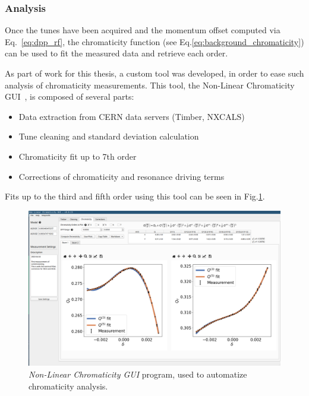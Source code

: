 \subsubsection{Analysis}

Once the tunes have been acquired and the momentum offset computed via Eq.~\eqref{eq:dpp_rf}, the
chromaticity function (see Eq.\eqref{eq:background_chromaticity}) can be used to fit the
measured data and retrieve each order.

As part of work for this thesis, a custom tool was developed, in order to ease such analysis of
chromaticity measurements. This tool, the Non-Linear Chromaticity
GUI~\cite{m_le_garrec_non-linear_2022}, is composed of several parts:

\begin{itemize}
    \tightlist
    \item Data extraction from CERN data servers (Timber, NXCALS)
    \item Tune cleaning and standard deviation calculation
    \item Chromaticity fit up to 7th order
    \item Corrections of chromaticity and resonance driving terms
\end{itemize}

Fits up to the third and fifth order using this tool can be seen in Fig.\ref{fig:chroma_gui}.

\begin{figure}[H]
    \includegraphics[width=\textwidth]{./images/chroma_gui.png}
    \caption{\textit{Non-Linear Chromaticity GUI} program, used to automatize chromaticity 
             analysis.}
    \label{fig:chroma_gui}
\end{figure}
